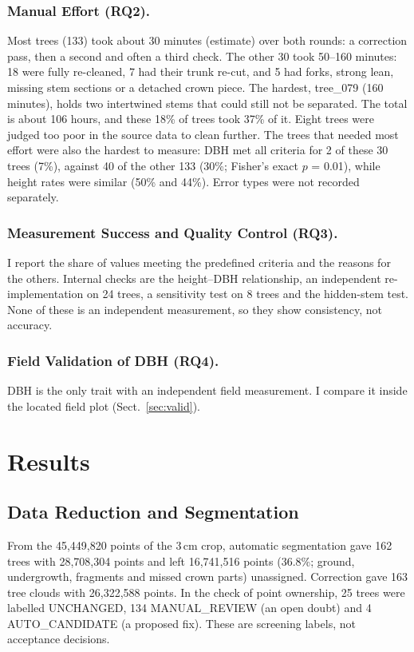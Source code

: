 \documentclass[runningheads]{llncs}
\begin{document}
\subsubsection{Manual Effort (RQ2).}
Most trees (133) took about 30 minutes (estimate) over both rounds: a correction pass, then a second and often a third check. The other 30 took 50--160 minutes: 18 were fully re-cleaned, 7 had their trunk re-cut, and 5 had forks, strong lean, missing stem sections or a detached crown piece. The hardest, tree\_079 (160 minutes), holds two intertwined stems that could still not be separated. The total is about 106 hours, and these 18\% of trees took 37\% of it. Eight trees were judged too poor in the source data to clean further. The trees that needed most effort were also the hardest to measure: DBH met all criteria for 2 of these 30 trees (7\%), against 40 of the other 133 (30\%; Fisher's exact $p$ = 0.01), while height rates were similar (50\% and 44\%). Error types were not recorded separately.

\subsubsection{Measurement Success and Quality Control (RQ3).}
I report the share of values meeting the predefined criteria and the reasons for the others. Internal checks are the height--DBH relationship, an independent re-implementation on 24 trees, a sensitivity test on 8 trees and the hidden-stem test. None of these is an independent measurement, so they show consistency, not accuracy.

\subsubsection{Field Validation of DBH (RQ4).}
DBH is the only trait with an independent field measurement. I compare it inside the located field plot (Sect.~\ref{sec:valid}).

\section{Results}\label{sec:results}

\subsection{Data Reduction and Segmentation}\label{sec:res-seg}
From the 45,449,820 points of the 3\,cm crop, automatic segmentation gave 162 trees with 28,708,304 points and left 16,741,516 points (36.8\%; ground, undergrowth, fragments and missed crown parts) unassigned. Correction gave 163 tree clouds with 26,322,588 points. In the check of point ownership, 25 trees were labelled UNCHANGED, 134 MANUAL\_REVIEW (an open doubt) and 4 AUTO\_CANDIDATE (a proposed fix). These are screening labels, not acceptance decisions.
\end{document}
